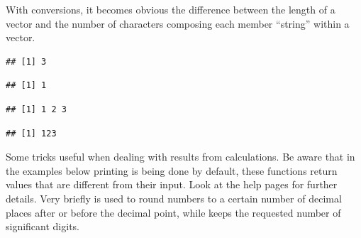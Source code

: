\documentclass[krantz2]{krantz}\usepackage{knitr}%
\begin{document}
\begin{explainbox}
With conversions, it becomes obvious the difference between the length of a  vector and the number of characters composing each member ``string'' within a vector.

\begin{knitrout}\footnotesize
{}\color{fgcolor}\begin{kframe}
\begin{alltt}
 \hlkwb{<-} \hlstd{(}\hlstd{,} \hlstd{,} \hlstd{)}
\end{alltt}
\begin{verbatim}
## [1] 3
\end{verbatim}
\begin{alltt}
 \hlkwb{<-} 
\end{alltt}
\begin{verbatim}
## [1] 1
\end{verbatim}
\begin{alltt}
\end{alltt}
\begin{verbatim}
## [1] 1 2 3
\end{verbatim}
\begin{alltt}
\end{alltt}
\begin{verbatim}
## [1] 123
\end{verbatim}
\end{kframe}
\end{knitrout}
\end{explainbox}

Some tricks useful when dealing with  results from calculations. Be aware that in the examples below printing is being done by default, these functions return  values that are different from their input. Look at the help pages for further details. Very briefly  is used to round numbers to a certain number of decimal places after or before the decimal point, while  keeps the requested number of significant digits.
\end{document}
